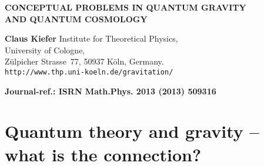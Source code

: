 \documentclass[12pt,a4paper]{article}
\begin{document}
\begin{titlepage}

\noindent
\begin{center}
\vspace*{1cm}

{\bf\textsc CONCEPTUAL PROBLEMS IN QUANTUM GRAVITY \\ AND QUANTUM
  COSMOLOGY}   
  
\vskip 1cm

{\bf Claus Kiefer} 
\vskip 0.4cm
Institute for Theoretical Physics,\\ University of Cologne, \\
Z\"ulpicher Strasse~77,
50937 K\"oln, Germany.\\ {\tt http://www.thp.uni-koeln.de/gravitation/}
\vspace{1cm}


\begin{abstract}
The search for a consistent and empirically established quantum theory
of gravity is among the biggest open problems of fundamental
physics. The obstacles are of formal and of conceptual nature. Here, I
address the main conceptual problems, discuss their present
status and outline further directions of research. For this purpose,
the main current approaches to quantum 
gravity are briefly reviewed and compared. 
\end{abstract}

\vskip 1cm

{\bf Journal-ref.: ISRN Math.Phys. 2013 (2013) 509316}
      

\end{center}

\end{titlepage}


\section{Quantum theory and gravity -- what is the connection?}
\end{document}
